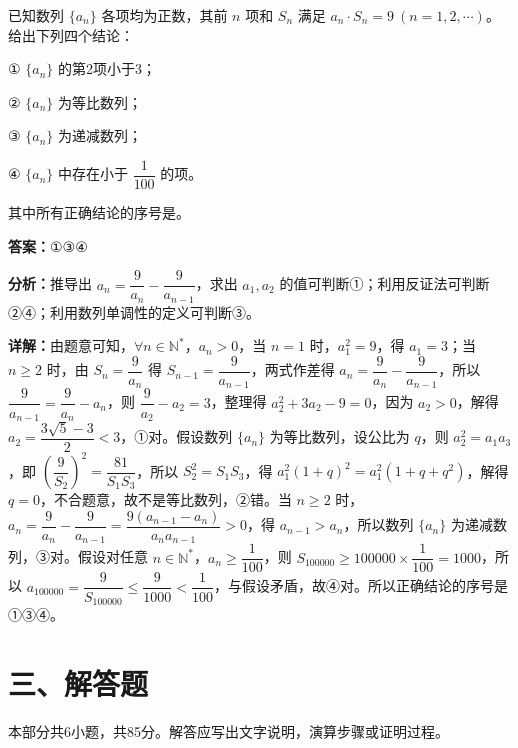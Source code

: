 \begin{question}[points=5]
已知数列 $\{a_n\}$ 各项均为正数，其前 $n$ 项和 $S_n$ 满足 $a_n \cdot S_n = 9\ (n=1,2,\cdots)$。给出下列四个结论：

① $\{a_n\}$ 的第2项小于3；

② $\{a_n\}$ 为等比数列；

③ $\{a_n\}$ 为递减数列；

④ $\{a_n\}$ 中存在小于 $\dfrac{1}{100}$ 的项。

其中所有正确结论的序号是。
\fillin[{$①③④$}]
\begin{solution}
\textbf{答案：}$①③④$

\textbf{分析：}推导出 $a_n = \dfrac{9}{a_n} - \dfrac{9}{a_{n-1}}$，求出 $a_1,a_2$ 的值可判断①；利用反证法可判断②④；利用数列单调性的定义可判断③。

\textbf{详解：}由题意可知，$\forall n\in \mathbb{N}^*$，$a_n>0$，当 $n=1$ 时，$a_1^2 = 9$，得 $a_1=3$；当 $n\geq 2$ 时，由 $S_n = \dfrac{9}{a_n}$ 得 $S_{n-1} = \dfrac{9}{a_{n-1}}$，两式作差得 $a_n = \dfrac{9}{a_n} - \dfrac{9}{a_{n-1}}$，所以 $\dfrac{9}{a_{n-1}} = \dfrac{9}{a_n} - a_n$，则 $\dfrac{9}{a_2} - a_2 = 3$，整理得 $a_2^2+3a_2-9=0$，因为 $a_2>0$，解得 $a_2 = \dfrac{3\sqrt{5}-3}{2} < 3$，①对。假设数列 $\{a_n\}$ 为等比数列，设公比为 $q$，则 $a_2^2 = a_1a_3$，即 $\left(\dfrac{9}{S_2}\right)^2 = \dfrac{81}{S_1S_3}$，所以 $S_2^2 = S_1S_3$，得 $a_1^2(1+q)^2 = a_1^2(1+q+q^2)$，解得 $q=0$，不合题意，故不是等比数列，②错。当 $n\geq 2$ 时，$a_n = \dfrac{9}{a_n} - \dfrac{9}{a_{n-1}} = \dfrac{9(a_{n-1}-a_n)}{a_n a_{n-1}} > 0$，得 $a_{n-1} > a_n$，所以数列 $\{a_n\}$ 为递减数列，③对。假设对任意 $n\in \mathbb{N}^*$，$a_n \geq \dfrac{1}{100}$，则 $S_{100000} \geq 100000 \times \dfrac{1}{100} = 1000$，所以 $a_{100000} = \dfrac{9}{S_{100000}} \leq \dfrac{9}{1000} < \dfrac{1}{100}$，与假设矛盾，故④对。所以正确结论的序号是①③④。
\end{solution}
\end{question}

\section*{三、解答题}
本部分共6小题，共85分。解答应写出文字说明，演算步骤或证明过程。

